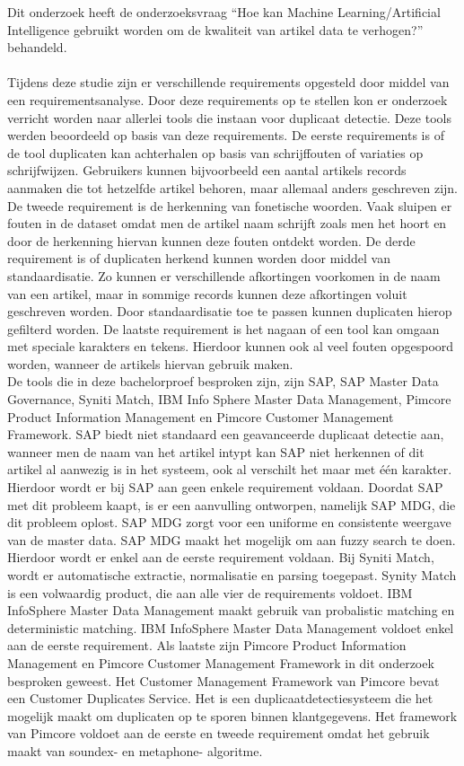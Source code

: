 Dit onderzoek heeft de onderzoeksvraag “Hoe kan Machine Learning/Artificial Intelligence gebruikt worden om de kwaliteit van artikel data te verhogen?” behandeld. 
\\ \\Tijdens deze studie zijn er verschillende requirements opgesteld door middel van een requirementsanalyse. Door deze requirements op te stellen kon er onderzoek verricht worden naar allerlei tools die instaan voor duplicaat detectie. Deze tools werden beoordeeld op basis van deze requirements. De eerste requirements is of de tool duplicaten kan achterhalen op basis van schrijffouten of variaties op schrijfwijzen. Gebruikers kunnen bijvoorbeeld een aantal artikels records aanmaken die tot hetzelfde artikel behoren, maar allemaal anders geschreven zijn. De tweede requirement is de herkenning van fonetische woorden. Vaak sluipen er fouten in de dataset omdat men de artikel naam schrijft zoals men het hoort en door de herkenning hiervan kunnen deze fouten ontdekt worden. De derde requirement is of duplicaten herkend kunnen worden door middel van standaardisatie. Zo kunnen er verschillende afkortingen voorkomen in de naam van een artikel, maar in sommige records kunnen deze afkortingen voluit geschreven worden. Door standaardisatie toe te passen kunnen duplicaten hierop gefilterd worden. De laatste requirement is het nagaan of een tool kan omgaan met speciale karakters en tekens. Hierdoor kunnen ook al veel fouten opgespoord worden, wanneer de artikels hiervan gebruik maken.
\\De tools die in deze bachelorproef besproken zijn, zijn SAP, SAP Master Data Governance, Syniti Match, IBM Info Sphere Master Data Management, Pimcore Product Information Management en Pimcore Customer Management Framework.  SAP biedt niet standaard een geavanceerde duplicaat detectie aan, wanneer men de naam van het artikel intypt kan SAP niet herkennen of dit artikel al aanwezig is in het systeem, ook al verschilt het maar met één karakter. Hierdoor wordt er bij SAP aan geen enkele requirement voldaan. Doordat SAP met dit probleem kaapt, is er een aanvulling ontworpen, namelijk SAP MDG, die dit probleem oplost. SAP MDG zorgt voor een uniforme en consistente weergave van de master data. SAP MDG maakt het mogelijk om aan fuzzy search te doen.  Hierdoor wordt er enkel aan de eerste requirement voldaan. Bij Syniti Match, wordt er automatische extractie, normalisatie en parsing toegepast. Synity Match is een volwaardig product, die aan alle vier de requirements voldoet. IBM InfoSphere Master Data Management maakt gebruik van probalistic matching en deterministic matching.  IBM InfoSphere Master Data Management voldoet enkel aan de eerste requirement. Als laatste zijn Pimcore Product Information Management en Pimcore Customer Management Framework in dit onderzoek besproken geweest. Het Customer Management Framework van Pimcore bevat een Customer Duplicates Service. Het is een duplicaatdetectiesysteem die het mogelijk maakt om duplicaten op te sporen binnen klantgegevens. Het framework van Pimcore voldoet aan de eerste en tweede requirement omdat het gebruik maakt van soundex- en metaphone- algoritme.

